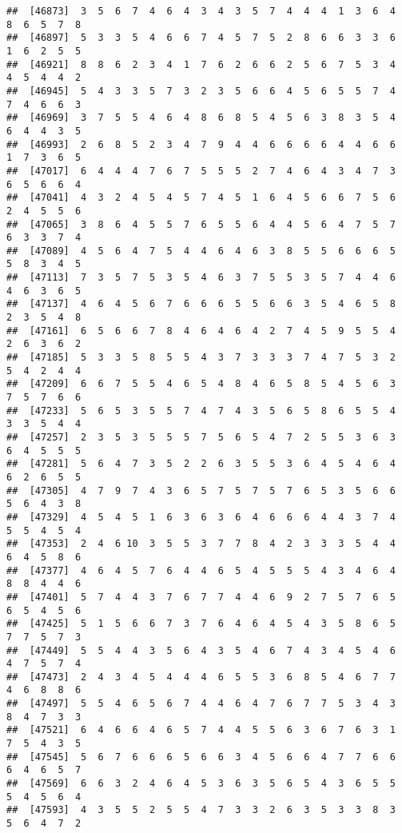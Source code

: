 \documentclass[
]{book}
\begin{document}
\begin{verbatim}
##  [46873]  3  5  6  7  4  6  4  3  4  3  5  7  4  4  4  1  3  6  4  8  6  5  7  8
##  [46897]  5  3  3  5  4  6  6  7  4  5  7  5  2  8  6  6  3  3  6  1  6  2  5  5
##  [46921]  8  8  6  2  3  4  1  7  6  2  6  6  2  5  6  7  5  3  4  4  5  4  4  2
##  [46945]  5  4  3  3  5  7  3  2  3  5  6  6  4  5  6  5  5  7  4  7  4  6  6  3
##  [46969]  3  7  5  5  4  6  4  8  6  8  5  4  5  6  3  8  3  5  4  6  4  4  3  5
##  [46993]  2  6  8  5  2  3  4  7  9  4  4  6  6  6  6  4  4  6  6  1  7  3  6  5
##  [47017]  6  4  4  4  7  6  7  5  5  5  2  7  4  6  4  3  4  7  3  6  5  6  6  4
##  [47041]  4  3  2  4  5  4  5  7  4  5  1  6  4  5  6  6  7  5  6  2  4  5  5  6
##  [47065]  3  8  6  4  5  5  7  6  5  5  6  4  4  5  6  4  7  5  7  6  3  3  7  4
##  [47089]  4  5  6  4  7  5  4  4  6  4  6  3  8  5  5  6  6  6  5  5  8  3  4  5
##  [47113]  7  3  5  7  5  3  5  4  6  3  7  5  5  3  5  7  4  4  6  4  6  3  6  5
##  [47137]  4  6  4  5  6  7  6  6  6  5  5  6  6  3  5  4  6  5  8  2  3  5  4  8
##  [47161]  6  5  6  6  7  8  4  6  4  6  4  2  7  4  5  9  5  5  4  2  6  3  6  2
##  [47185]  5  3  3  5  8  5  5  4  3  7  3  3  3  7  4  7  5  3  2  5  4  2  4  4
##  [47209]  6  6  7  5  5  4  6  5  4  8  4  6  5  8  5  4  5  6  3  7  5  7  6  6
##  [47233]  5  6  5  3  5  5  7  4  7  4  3  5  6  5  8  6  5  5  4  3  3  5  4  4
##  [47257]  2  3  5  3  5  5  5  7  5  6  5  4  7  2  5  5  3  6  3  6  4  5  5  5
##  [47281]  5  6  4  7  3  5  2  2  6  3  5  5  3  6  4  5  4  6  4  6  2  6  5  5
##  [47305]  4  7  9  7  4  3  6  5  7  5  7  5  7  6  5  3  5  6  6  5  6  4  3  8
##  [47329]  4  5  4  5  1  6  3  6  3  6  4  6  6  6  4  4  3  7  4  5  5  4  5  4
##  [47353]  2  4  6 10  3  5  5  3  7  7  8  4  2  3  3  3  5  4  4  6  4  5  8  6
##  [47377]  4  6  4  5  7  6  4  4  6  5  4  5  5  5  4  3  4  6  4  8  8  4  4  6
##  [47401]  5  7  4  4  3  7  6  7  7  4  4  6  9  2  7  5  7  6  5  6  5  4  5  6
##  [47425]  5  1  5  6  6  7  3  7  6  4  6  4  5  4  3  5  8  6  5  7  7  5  7  3
##  [47449]  5  5  4  4  3  5  6  4  3  5  4  6  7  4  3  4  5  4  6  4  7  5  7  4
##  [47473]  2  4  3  4  5  4  4  4  6  5  5  3  6  8  5  4  6  7  7  4  6  8  8  6
##  [47497]  5  5  4  6  5  6  7  4  4  6  4  7  6  7  7  5  3  4  3  8  4  7  3  3
##  [47521]  6  4  6  6  4  6  5  7  4  4  5  5  6  3  6  7  6  3  1  7  5  4  3  5
##  [47545]  5  6  7  6  6  6  5  6  6  3  4  5  6  6  4  7  7  6  6  6  4  6  5  7
##  [47569]  6  6  3  2  4  6  4  5  3  6  3  5  6  5  4  3  6  5  5  5  4  5  6  4
##  [47593]  4  3  5  5  2  5  5  4  7  3  3  2  6  3  5  3  3  8  3  5  6  4  7  2

\end{verbatim}
\end{document}
